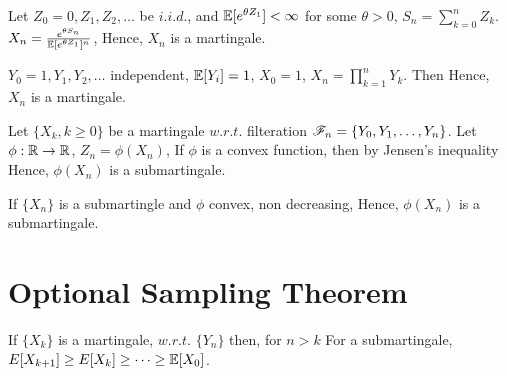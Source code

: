 \documentclass[all-lectures.tex]{subfiles}
\begin{document}
\begin{exmp}
Let $Z_0=0, Z_1, Z_2, \dots $ be $i.i.d.$, and $\mathbb{E}[e^{\theta Z_1}] < \infty$ for some $\theta >0$, $S_n = \sum_{k=0}^{n} Z_k$. $X_n = \frac{e^{\theta S_n}}{\mathbb{E}[e^{\theta Z_1}]^n}$,
Hence, $X_n$ is a martingale.
\end{exmp}

\begin{exmp}
	$Y_0 = 1, Y_1, Y_2, \dots$	independent, $\mathbb{E}[Y_i] = 1$, $X_0 =1$, $X_n = \prod_{k=1}^{n} Y_k$. Then
	Hence, $X_n$ is a martingale.
\end{exmp}

\begin{exmp}
Let $\{X_k, k\ge 0\}$ be a martingale $w.r.t.$ filteration $\mathscr{F}_n=\{Y_0, Y_1, \dots, Y_ n\}$. Let $\phi:\mathbb{R} \to \mathbb{R}$, $Z_n = \phi(X_n)$,
If $\phi$ is a convex function, then by Jensen's inequality
Hence, $\phi(X_n)$ is a submartingale.
\end{exmp}
If $\{X_n\}$ is a submartingle and $\phi$ convex, non decreasing,
Hence, $\phi(X_n)$ is a submartingale.

\section{Optional Sampling Theorem}


If $\{X_k\}$ is a martingale, $w.r.t.$ $\{Y_n\}$ then, for $n>k$
For a submartingale, $E[X_{k+1}] \ge E[X_k] \ge \dots \ge \mathbb{E}[X_0]$.
\end{document}

